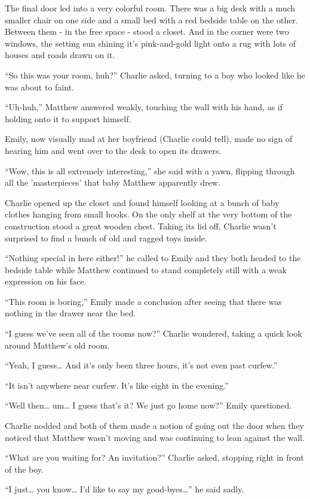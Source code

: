 The final door led into a very colorful room. There was a big desk with a much smaller chair on one side and a small bed with a red bedside table on the other. Between them - in the free space - stood a closet. And in the corner were two windows, the setting sun shining it's pink-and-gold light onto a rug with lots of houses and roads drawn on it.

“So this was your room, huh?” Charlie asked, turning to a boy who looked like he was about to faint.

“Uh-huh,” Matthew answered weakly, touching the wall with his hand, as if holding onto it to support himself.

Emily, now visually mad at her boyfriend (Charlie could tell), made no sign of hearing him and went over to the desk to open its drawers.

“Wow, this is all extremely interesting,” she said with a yawn, flipping through all the 'masterpieces' that baby Matthew apparently drew.

Charlie opened up the closet and found himself looking at a bunch of baby clothes hanging from small hooks. On the only shelf at the very bottom of the construction stood a great wooden chest. Taking its lid off, Charlie wasn't surprised to find a bunch of old and ragged toys inside.

“Nothing special in here either!” he called to Emily and they both headed to the bedside table while Matthew continued to stand completely still with a weak expression on his face.

“This room is boring,” Emily made a conclusion after seeing that there was nothing in the drawer near the bed.

“I guess we've seen all of the rooms now?” Charlie wondered, taking a quick look around Matthew's old room.

“Yeah, I guess… And it's only been three hours, it's not even past curfew.”

“It isn't anywhere near curfew. It's like eight in the evening.”

“Well then… um… I guess that's it? We just go home now?” Emily questioned.

Charlie nodded and both of them made a notion of going out the door when they noticed that Matthew wasn't moving and was continuing to lean against the wall.

“What are you waiting for? An invitation?” Charlie asked, stopping right in front of the boy.

“I just… you know… I'd like to say my good-byes…” he said sadly.


